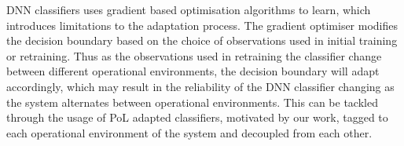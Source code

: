 DNN classifiers uses gradient based optimisation algorithms to learn, which introduces limitations to the adaptation process. 
%
    The gradient optimiser modifies the decision boundary based on the choice of observations used in initial training or retraining. 
    Thus as the observations used in retraining the classifier change between different operational environments, the decision boundary will adapt accordingly, which may result in the reliability of the DNN classifier changing as the system alternates between operational environments. 
    This can be tackled through the usage of PoL adapted classifiers, motivated by our work, tagged to each operational environment of the system and decoupled from each other. 
    
